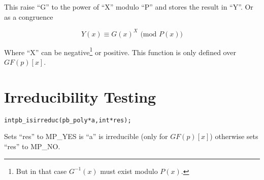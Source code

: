 \documentclass[b5paper]{book}
\begin{document}
This raise ``G'' to the power of ``X'' modulo ``P'' and stores the result in ``Y''. Or as a congruence

\begin{equation}
Y(x) \equiv G(x)^X \mbox{ (mod }P(x)\mbox{)}
\end{equation}

Where ``X'' can be negative\footnote{But in that case $G^{-1}(x)$ must exist modulo $P(x)$.} or positive.  This function
is only defined over $GF(p)[x]$.  

\section{Irreducibility Testing}
\begin{alltt}
int pb_isirreduc(pb_poly *a, int *res);
\end{alltt}
Sets ``res'' to MP\_YES is ``a'' is irreducible (only for $GF(p)[x]$) otherwise sets ``res'' to MP\_NO.  


\end{document}
